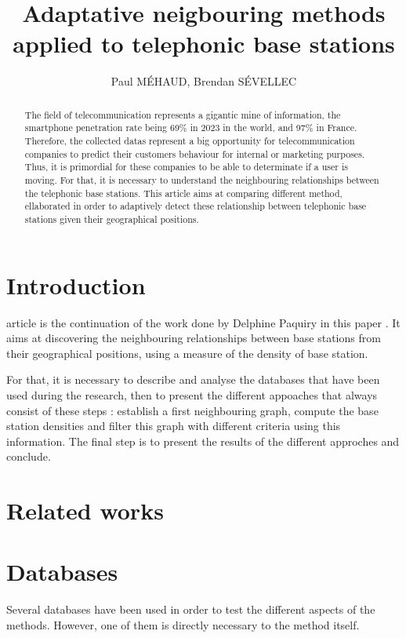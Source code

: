 \documentclass[lettersize,journal]{IEEEtran}
\title{Adaptative neigbouring methods applied to telephonic base stations}
\author{Paul MÉHAUD, Brendan SÉVELLEC}
\begin{document}
\maketitle

\begin{abstract}
  The field of telecommunication represents a gigantic mine of information, the smartphone penetration rate being 69\%
  in 2023 in the world, and 97\% in France. Therefore, the collected datas represent a big opportunity for telecommunication
  companies to predict their customers behaviour for internal or marketing purposes. Thus, it is primordial for these companies
  to be able to determinate if a user is moving. For that, it is necessary to understand the neighbouring relationships between the 
  telephonic base stations. This article aims at comparing different method, ellaborated in order to adaptively detect these
  relationship between telephonic base stations given their geographical positions.
\end{abstract}

\section{Introduction}
     article is the continuation of the work done by Delphine Paquiry in this paper \cite{art_del_paq}.
    It aims at discovering the neighbouring relationships between base stations from their geographical positions, using a 
    measure of the density of base station.

    For that, it is necessary to describe and analyse the databases that have been used during the research, then to present 
    the different appoaches that always consist of these steps : establish a first neighbouring graph, compute the base station 
    densities and filter this graph with different criteria using this information. The final step is to present the results
    of the different approches and conclude.
\section{Related works}

\section{Databases}
    Several databases have been used in order to test the different aspects of the methods. However, one of
    them is directly necessary to the method itself.
\end{document}
